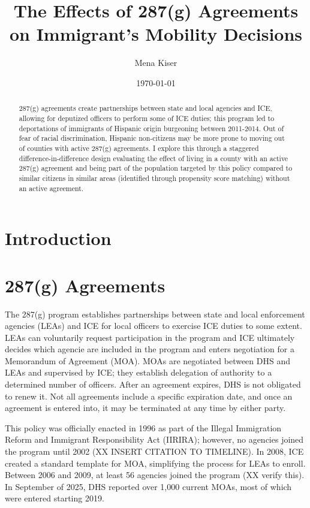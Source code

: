 \documentclass{article}
\title{The Effects of 287(g) Agreements on Immigrant's Mobility Decisions}
\author{Mena Kiser}
\date{\today}
\begin{document}
\doublespacing
\maketitle

\begin{abstract}
    287(g) agreements create partnerships between state and local agencies and ICE, allowing for deputized officers to perform some of ICE duties; this program led to deportations of immigrants of Hispanic origin burgeoning between 2011-2014. Out of fear of racial discrimination, Hispanic non-citizens may be more prone to moving out of counties with active 287(g) agreements. I explore this through a staggered difference-in-difference design evaluating the effect of living in a county with an active 287(g) agreement and being part of the population targeted by this policy compared to similar citizens in similar areas (identified through propensity score matching) without an active agreement. 
\end{abstract}

\section{Introduction}

\section{287(g) Agreements}
The 287(g) program establishes partnerships between state and local enforcement agencies (LEAs) and ICE for local officers to exercise ICE duties to some extent. LEAs can voluntarily request participation in the program and ICE ultimately decides which agencie are included in the program and enters negotiation for a Memorandum of Agreement (MOA). MOAs are negotiated between DHS and LEAs and supervised by ICE; they establish delegation of authority to a determined number of officers. After an agreement expires, DHS is not obligated to renew it. Not all agreements include a specific expiration date, and once an agreement is entered into, it may be terminated at any time by either party.

This policy was officially enacted in 1996 as part of the Illegal Immigration Reform and Immigrant Responsibility Act (IIRIRA); however, no agencies joined the program until 2002 (XX INSERT CITATION TO TIMELINE). In 2008, ICE created a standard template for MOA, simplifying the process for LEAs to enroll. Between 2006 and 2009, at least 56 agencies joined the program (XX verify this). In September of 2025, DHS reported over 1,000 current MOAs, most of which were entered starting 2019.
\end{document}
